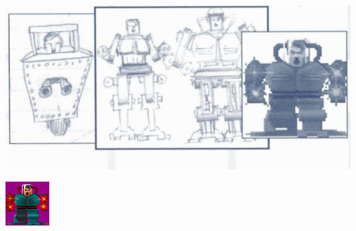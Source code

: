 \documentclass[book.tex]{subfiles}
\begin{document}
    \begin{minipage}{.48\textwidth}
     \includegraphics[width=\textwidth]{imgs/tom_hall_sketch_adolf.png}
  \end{minipage}
      \begin{minipage}{.48\textwidth}
     \includegraphics[width=\textwidth]{imgs/sprites/adolf.png}
  \end{minipage}
\end{document}
